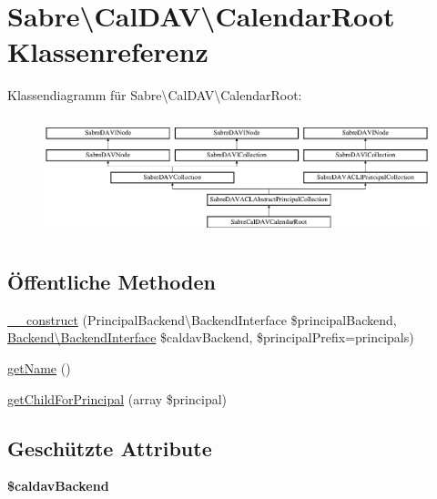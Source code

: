 \hypertarget{class_sabre_1_1_cal_d_a_v_1_1_calendar_root}{}\section{Sabre\textbackslash{}Cal\+D\+AV\textbackslash{}Calendar\+Root Klassenreferenz}
\label{class_sabre_1_1_cal_d_a_v_1_1_calendar_root}
Klassendiagramm für Sabre\textbackslash{}Cal\+D\+AV\textbackslash{}Calendar\+Root\+:\begin{figure}[H]
\begin{center}
\leavevmode
\includegraphics[height=3.495631cm]{class_sabre_1_1_cal_d_a_v_1_1_calendar_root}
\end{center}
\end{figure}
\subsection*{Öffentliche Methoden}
\begin{DoxyCompactItemize}
\item 
\mbox{\hyperlink{class_sabre_1_1_cal_d_a_v_1_1_calendar_root_a33589a31edb7c16ea8914075cccdd9e0}{\+\_\+\+\_\+construct}} (Principal\+Backend\textbackslash{}\+Backend\+Interface \$principal\+Backend, \mbox{\hyperlink{interface_sabre_1_1_cal_d_a_v_1_1_backend_1_1_backend_interface}{Backend\textbackslash{}\+Backend\+Interface}} \$caldav\+Backend, \$principal\+Prefix=\textquotesingle{}principals\textquotesingle{})
\item 
\mbox{\hyperlink{class_sabre_1_1_cal_d_a_v_1_1_calendar_root_a360248ff540e3fb0845cf76d17f87ec5}{get\+Name}} ()
\item 
\mbox{\hyperlink{class_sabre_1_1_cal_d_a_v_1_1_calendar_root_ad74dd214d75c15a3ec2472ac44df595a}{get\+Child\+For\+Principal}} (array \$principal)
\end{DoxyCompactItemize}
\subsection*{Geschützte Attribute}
\begin{DoxyCompactItemize}
\item 
\mbox{\label{class_sabre_1_1_cal_d_a_v_1_1_calendar_root_a70c331eee098fe9551e992bb6a1629fb}} 
{\bfseries \$caldav\+Backend}
\end{DoxyCompactItemize}
